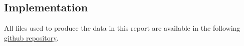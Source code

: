 \subsection{Implementation}

All files used to produce the data in this report are available in the following \href{https://github.com/kellertuer/TMA4500-Project-Hovland-Symplectic-Stiefel.git}{github repository}\cite{Hovland2024}.